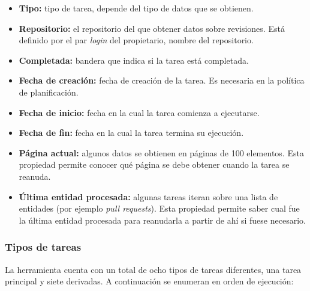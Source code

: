 \begin{itemize}
\tightlist
	\item \textbf{Tipo:} tipo de tarea, depende del tipo de datos que se obtienen.
	\item \textbf{Repositorio:} el repositorio del que obtener datos sobre revisiones. Está definido por el par \emph{login} del propietario, nombre del repositorio.
	\item \textbf{Completada:} bandera que indica si la tarea está completada.
	\item \textbf{Fecha de creación:} fecha de creación de la tarea. Es necesaria en la política de planificación.
	\item \textbf{Fecha de inicio:} fecha en la cual la tarea comienza a ejecutarse.
	\item \textbf{Fecha de fin:} fecha en la cual la tarea termina su ejecución.
	\item \textbf{Página actual:} algunos datos se obtienen en páginas de 100 elementos. Esta propiedad permite conocer qué página se debe obtener cuando la tarea se reanuda.
	\item \textbf{Última entidad procesada:} algunas tareas iteran sobre una lista de entidades (por ejemplo \emph{pull requests}). Esta propiedad permite saber cual fue la última entidad procesada para reanudarla a partir de ahí si fuese necesario.
\end{itemize}

\subsubsection{Tipos de tareas}

La herramienta cuenta con un total de ocho tipos de tareas diferentes, una tarea principal y siete derivadas. A continuación se enumeran en orden de ejecución:

